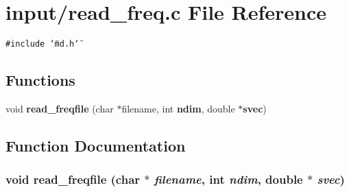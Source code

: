\section{input/read\_\-freq.c File Reference}
\label{read__freq_8c}
{\tt \#include \char`\"{}md.h\char`\"{}}\par
\subsection*{Functions}
\begin{CompactItemize}
\item 
void {\bf read\_\-freqfile} (char $\ast$filename, int {\bf ndim}, double $\ast${\bf svec})
\end{CompactItemize}


\subsection{Function Documentation}
\subsubsection{\setlength{\rightskip}{0pt plus 5cm}void read\_\-freqfile (char $\ast$ {\em filename}, int {\em ndim}, double $\ast$ {\em svec})}\label{read__freq_8c_0d4f4e5e57f69b912ae91f371b05eb49}



